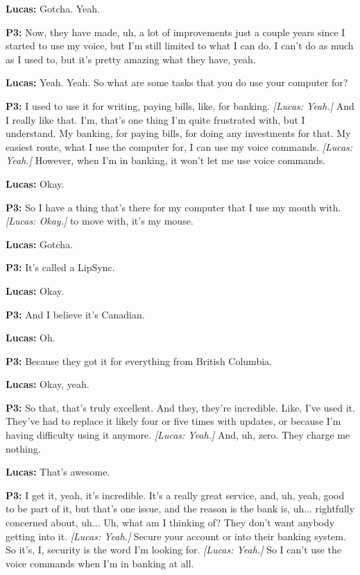 \textbf{Lucas:} Gotcha. Yeah. 

\textbf{P3:} Now, they have made, uh, a lot of improvements just a couple years since I started to use my voice, but I'm still limited to what I can do. I can't do as much as I used to, but it's pretty amazing what they have, yeah. 

\textbf{Lucas:} Yeah. Yeah. So what are some tasks that you do use your computer for? 

\textbf{P3:} I used to use it for writing, paying bills, like, for banking. \textit{[Lucas: Yeah.]} And I really like that. I'm, that's one thing I'm quite frustrated with, but I understand. My banking, for paying bills, for doing any investments for that. My easiest route, what I use the computer for, I can use my voice commands. \textit{[Lucas: Yeah.]} However, when I'm in banking, it won't let me use voice commands. 

\textbf{Lucas:} Okay. 

\textbf{P3:} So I have a thing that's there for my computer that I use my mouth with. \textit{[Lucas: Okay.]} to move with, it's my mouse. 

\textbf{Lucas:} Gotcha. 

\textbf{P3:} It's called a LipSync. 

\textbf{Lucas:} Okay. 

\textbf{P3:} And I believe it's Canadian. 

\textbf{Lucas:} Oh. 

\textbf{P3:} Because they got it for everything from British Columbia. 

\textbf{Lucas:} Okay, yeah. 

\textbf{P3:} So that, that's truly excellent. And they, they're incredible. Like, I've used it. They've had to replace it likely four or five times with updates, or because I'm having difficulty using it anymore. \textit{[Lucas: Yeah.]} And, uh, zero. They charge me nothing. 

\textbf{Lucas:} That's awesome. 

\textbf{P3:} I get it, yeah, it's incredible. It's a really great service, and, uh, yeah, good to be part of it, but that's one issue, and the reason is the bank is, uh... rightfully concerned about, uh... Uh, what am I thinking of? They don't want anybody getting into it. \textit{[Lucas: Yeah.]} Secure your account or into their banking system. So it's, I, security is the word I'm looking for. \textit{[Lucas: Yeah.]} So I can't use the voice commands when I'm in banking at all. 

